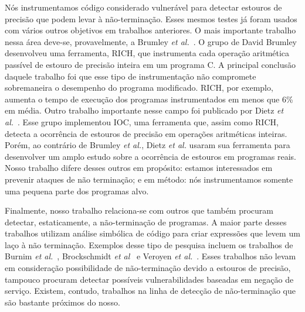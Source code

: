 \documentclass{llncs}
\begin{document}
Nós instrumentamos código considerado vulnerável para detectar estouros de
precisão que podem levar à não-terminação.
Esses mesmos testes já foram usados com vários outros objetivos em trabalhos
anteriores.
O mais importante trabalho nessa área deve-se, provavelmente, a Brumley
{\em et al.}~\cite{Brumley07}.
O grupo de David Brumley desenvolveu uma ferramenta, RICH, que instrumenta
cada operação aritmética passível de estouro de precisão inteira em um programa
C.
A principal conclusão daquele trabalho foi que esse tipo de instrumentação
não compromete sobremaneira o desempenho do programa modificado.
RICH, por exemplo, aumenta o tempo de execução dos programas instrumentados
em menos que 6\% em média.
Outro trabalho importante nesse campo foi publicado por Dietz
{\em et al.}~\cite{Dietz12}.
Esse grupo implementou IOC, uma ferramenta que, assim como RICH, detecta a
ocorrência de estouros de precisão em operações aritméticas inteiras.
Porém, ao contrário de Brumley {\em et al.}, Dietz {\em et al.} usaram sua
ferramenta para desenvolver um amplo estudo sobre a ocorrência de estouros
em programas reais.
Nosso trabalho difere desses outros em propósito: estamos interessados em
prevenir ataques de não terminação; e em método: nós instrumentamos somente uma
pequena parte dos programas alvo.

Finalmente, nosso trabalho relaciona-se com outros que também procuram
detectar, estaticamente, a não-terminação de programas.
A maior parte desses trabalhos utilizam análise simbólica de código para criar
expressões que levem um laço à não terminação.
Exemplos desse tipo de pesquisa incluem os trabalhos de Burnim
{\em et al.}~\cite{Burnim09}, Brockschmidt {\em et al}~\cite{Brockschmidt11} e
Veroyen {\em et al.}~\cite{Velroyen08}.
Esses trabalhos não levam em consideração possibilidade de não-terminação
devido a estouros de precisão, tampouco procuram detectar possíveis
vulnerabilidades baseadas em negação de serviço.
Existem, contudo, trabalhos na linha de detecção de não-terminação que são
bastante próximos do nosso.
\end{document}
